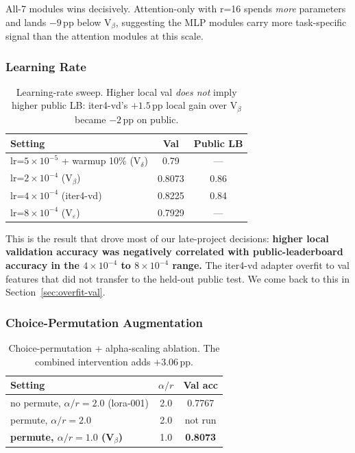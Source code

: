 \documentclass[11pt]{article}
\begin{document}
All-7 modules wins decisively. Attention-only with r=16 spends \emph{more} parameters and lands $-9$\,pp below V$_\beta$, suggesting the MLP modules carry more task-specific signal than the attention modules at this scale.

\subsubsection{Learning Rate}

\begin{table}[t]
\small
\begin{tabular}{@{}lcc@{}}
\toprule
\textbf{Setting} & \textbf{Val} & \textbf{Public LB} \\
\midrule
lr=$5\!\times\!10^{-5}$ + warmup 10\% (V$_\delta$) & 0.79 & --- \\
lr=$2\!\times\!10^{-4}$ (V$_\beta$) & 0.8073 & 0.86 \\
lr=$4\!\times\!10^{-4}$ (iter4-vd) & 0.8225 & 0.84 \\
lr=$8\!\times\!10^{-4}$ (V$_\varepsilon$) & 0.7929 & --- \\
\bottomrule
\end{tabular}
\caption{Learning-rate sweep. Higher local val \emph{does not} imply higher public LB: iter4-vd's $+1.5$\,pp local gain over V$_\beta$ became $-2$\,pp on public.}
\label{tab:lr}
\end{table}

This is the result that drove most of our late-project decisions: \textbf{higher local validation accuracy was negatively correlated with public-leaderboard accuracy in the $4\!\times\!10^{-4}$ to $8\!\times\!10^{-4}$ range.} The iter4-vd adapter overfit to val features that did not transfer to the held-out public test. We come back to this in Section~\ref{sec:overfit-val}.

\subsubsection{Choice-Permutation Augmentation}

\begin{table}[t]
\small
\begin{tabular}{@{}lcc@{}}
\toprule
\textbf{Setting} & \textbf{$\alpha/r$} & \textbf{Val acc} \\
\midrule
no permute, $\alpha/r=2.0$ (lora-001) & 2.0 & 0.7767 \\
permute, $\alpha/r=2.0$ & 2.0 & not run \\
\textbf{permute, $\alpha/r=1.0$ (V$_\beta$)} & 1.0 & \textbf{0.8073} \\
\bottomrule
\end{tabular}
\caption{Choice-permutation + alpha-scaling ablation. The combined intervention adds $+3.06$\,pp.}
\label{tab:permute}
\end{table}
\end{document}
